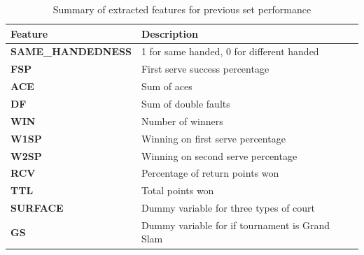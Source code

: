 \documentclass[paper=a4, fontsize=11pt]{scrartcl} %
\numberwithin{equation}{section} %
\numberwithin{figure}{section} %
\numberwithin{table}{section} %
\begin{document}
\begin{center}
\begin{table}[h]
    \begin{tabular}{  l | p{10cm} }
    \hline
    Feature  & Description \\ \hline
    \textbf{SAME\_HANDEDNESS}  & 1 for same handed, 0 for different handed \\ \hline
    \textbf{FSP}  & First serve success percentage \\ \hline
    \textbf{ACE}  & Sum of aces \\ \hline
    \textbf{DF}  & Sum of double faults \\ \hline
    \textbf{WIN}  & Number of winners \\ \hline
    \textbf{W1SP}  & Winning on first serve percentage \\ \hline
    \textbf{W2SP}  & Winning on second serve percentage \\ \hline
    \textbf{RCV}  & Percentage of return points won \\ \hline
    \textbf{TTL}  & Total points won \\ \hline
    \textbf{SURFACE}  & Dummy variable for three types of court\\ \hline
    \textbf{GS} & Dummy variable for if tournament is Grand Slam \\ \hline    
    \end{tabular}
    \caption{Summary of extracted features for previous set performance}
    \label{tab:features2}
    \end{table}
\end{center}
\end{document}

